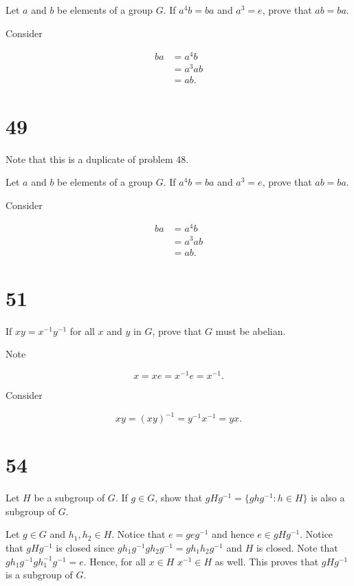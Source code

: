 \documentclass[a4paper]{article}
\begin{document}
Let $a$ and $b$ be elements of a group $G$. If $a^4b = ba$ and $a^3 = e$, prove that $ab = ba$.

\vspace{\baselineskip}

Consider

\begin{align*}
ba &= a^4b \\
&= a^3 ab \\
&= ab.
\end{align*}


\section*{49}

Note that this is a duplicate of problem 48.

Let $a$ and $b$ be elements of a group $G$. If $a^4b = ba$ and $a^3 = e$, prove that $ab = ba$.
\vspace{\baselineskip}

Consider

\begin{align*}
ba &= a^4b \\
&= a^3 ab \\
&= ab.
\end{align*}


\section*{51}

If $xy = x^{-1} y^{-1}$ for all $x$ and $y$ in $G$, prove that $G$ must be abelian.

\vspace{\baselineskip}

Note 

$$x = xe = x^{-1}e = x^{-1}.$$

Consider

$$xy = (xy)^{-1} = y^{-1} x^{-1} = yx.$$


\section*{54}

Let $H$ be a subgroup of $G$. If $g \in G$, show that $gHg^{-1} = \{ghg^{-1}: h \in H \}$ is also a subgroup of $G$.

\vspace{\baselineskip}

Let $g \in G$ and $h_1, h_2 \in H$. Notice that $e = geg^{-1}$ and hence $e \in gHg^{-1}$. Notice that $gHg^{-1}$ is closed since $gh_1g^{-1} g h_2 g^{-1} = g h_1 h_2 g^{-1}$ and $H$ is closed. Note that $g h_1 g^{-1} g h_1^{-1} g^{-1} = e$. Hence, for all $x \in H$ $x^{-1} \in H$ as well. This proves that $gHg^{-1}$ is a subgroup of $G$.
\end{document}
